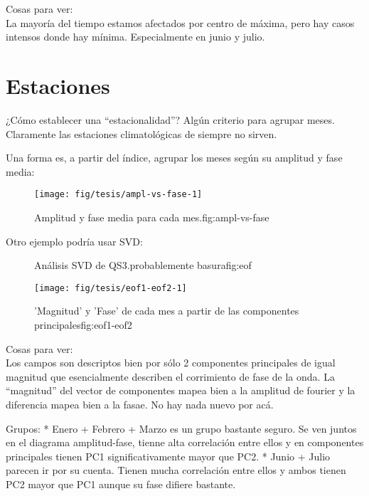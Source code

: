 \documentclass[spanish,a4paper]{book}
\begin{document}
Cosas para ver:\\
La mayoría del tiempo estamos afectados por centro de máxima, pero hay
casos intensos donde hay mínima. Especialmente en junio y julio.

\section{Estaciones}\label{estaciones}

¿Cómo establecer una ``estacionalidad''? Algún criterio para agrupar
meses. Claramente las estaciones climatológicas de siempre no sirven.

Una forma es, a partir del índice, agrupar los meses según su amplitud y
fase media:

\begin{figure}
\texttt{[image: fig/tesis/ampl-vs-fase-1]} \caption{Amplitud y fase media para cada mes.{fig:ampl-vs-fase}}\label{fig:ampl-vs-fase}
\end{figure}

Otro ejemplo podría usar SVD:

\begin{figure}
\newline{}\newline{}\caption{Análisis SVD de QS3.probablemente basura{fig:eof}}\label{fig:eof}
\end{figure}

\begin{figure}
\texttt{[image: fig/tesis/eof1-eof2-1]} \caption{'Magnitud' y 'Fase' de cada mes a partir de las componentes principales{fig:eof1-eof2}}\label{fig:eof1-eof2}
\end{figure}

Cosas para ver:\\
Los campos son descriptos bien por sólo 2 componentes principales de
igual magnitud que esencialmente describen el corrimiento de fase de la
onda. La ``magnitud'' del vector de componentes mapea bien a la amplitud
de fourier y la diferencia mapea bien a la fasae. No hay nada nuevo por
acá.

Grupos: * Enero + Febrero + Marzo es un grupo bastante seguro. Se ven
juntos en el diagrama amplitud-fase, tienne alta correlación entre ellos
y en componentes principales tienen PC1 significativamente mayor que
PC2. * Junio + Julio parecen ir por su cuenta. Tienen mucha correlación
entre ellos y ambos tienen PC2 mayor que PC1 aunque su fase difiere
bastante.
\end{document}
